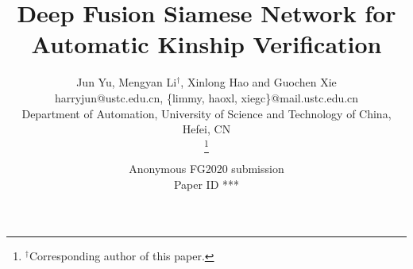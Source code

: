\documentclass[a4paper, 10pt, conference]{ieeeconf}      %
\title{\LARGE \bf
Deep Fusion Siamese Network for Automatic Kinship Verification
}
\author{\parbox{16cm}{\centering
    {\large Jun Yu, Mengyan Li{$^\dag$}, Xinlong Hao and Guochen Xie}\\
	 {harryjun@ustc.edu.cn, \{limmy, haoxl, xiegc\}@mail.ustc.edu.cn}\\
    {\normalsize Department of Automation, University of Science and Technology of China, Hefei, CN }
}
    \thanks{{$^\dag$}Corresponding author of this paper. }
}
\def\FGPaperID{***} %
\begin{document}
\ifFGfinal
\thispagestyle{empty}
\pagestyle{empty}
\else
\author{Anonymous FG2020 submission\\ Paper ID \FGPaperID \\}
\pagestyle{plain}
\fi
\maketitle



\begin{abstract}
\iffalse
Automatic kinship verification aims to determine whether some individuals belong to the same family. It is of great research significance to help missing persons reunite with their families. In this work, we propose a deep siamese network to quantify the relative similarity between two individuals. When given two input face images, the deep siamese network first extracts the features from them, and then these features are fused by combining and concatenating. Finally, the fused features are fed into a fully-connected network to obtain the similarity score between two faces, which is used to verify the kinship. Moreover, we employ a jury system for multi-model fusion. Besides, two deep siamese networks are integrated into a deep triplet network for tri-subject (i.e., father, mother and child) kinship verification, which is intended to decide whether a child is related to a pair of parents or not. Recognizing Families In the Wild (RFIW) is a challenging kinship recognition task with multiple tracks, which is based on Families in the Wild (FIW), a large-scale and comprehensive image database for automatic kinship recognition. The Kinship Verification (track I) and Tri-Subject Verification (track II) are supported during the ongoing RFIW2020 Challenge. Our team (ustc-nelslip) ranked 1st in track II, and 3rd in track I. The code is available at {\color{blue}https://github.com/gniknoil/FG2020-kinship}.
\fi

\end{abstract}
\end{document}
